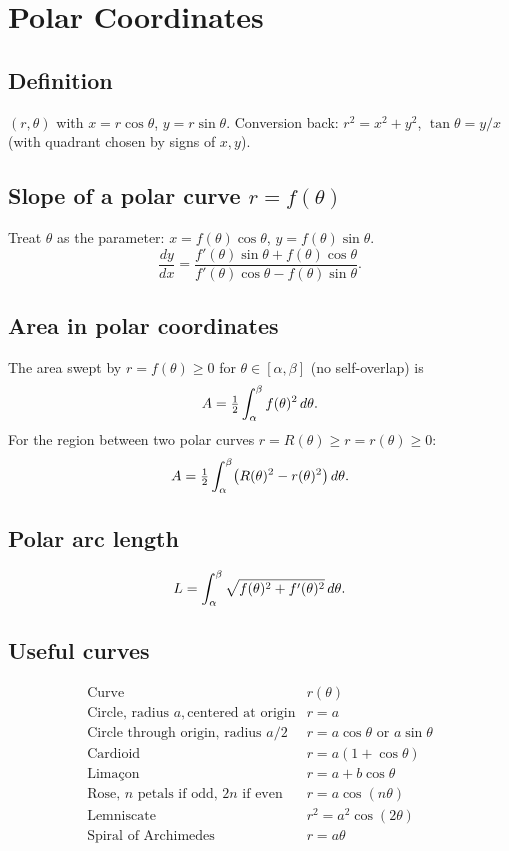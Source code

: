 \section{Polar Coordinates}

\subsection{Definition}
$(r, \theta)$ with $x = r \cos\theta$, $y = r \sin\theta$. Conversion back:
$r^2 = x^2 + y^2$, $\tan\theta = y/x$ (with quadrant chosen by signs of $x, y$).

\subsection{Slope of a polar curve $r = f(\theta)$}
Treat $\theta$ as the parameter: $x = f(\theta) \cos\theta$, $y = f(\theta) \sin\theta$.
\[ \frac{dy}{dx}
= \frac{f'(\theta) \sin\theta + f(\theta) \cos\theta}{f'(\theta) \cos\theta - f(\theta) \sin\theta}. \]

\subsection{Area in polar coordinates}
The area swept by $r = f(\theta) \ge 0$ for $\theta \in [\alpha, \beta]$ (no self-overlap) is
\[ A = \tfrac{1}{2} \int_\alpha^\beta f(\theta)^2 \,d\theta. \]
For the region between two polar curves $r = R(\theta) \ge r = r(\theta) \ge 0$:
\[ A = \tfrac{1}{2} \int_\alpha^\beta \bigl(R(\theta)^2 - r(\theta)^2\bigr) \,d\theta. \]

\subsection{Polar arc length}
\[ L = \int_\alpha^\beta \sqrt{f(\theta)^2 + f'(\theta)^2} \,d\theta. \]

\subsection{Useful curves}
\[
\renewcommand{\arraystretch}{1.3}
\begin{array}{l|l}
\text{Curve} & r(\theta) \\\hline
\text{Circle, radius } a, \text{centered at origin} & r = a \\
\text{Circle through origin, radius } a/2 & r = a \cos\theta \text{ or } a \sin\theta \\
\text{Cardioid} & r = a(1 + \cos\theta) \\
\text{Lima\c con} & r = a + b \cos\theta \\
\text{Rose, } n \text{ petals if odd, } 2n \text{ if even} & r = a \cos(n\theta) \\
\text{Lemniscate} & r^2 = a^2 \cos(2\theta) \\
\text{Spiral of Archimedes} & r = a\theta
\end{array}
\]

